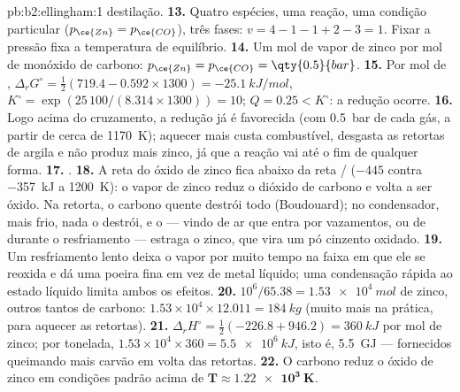\begin{solution}{pb:b2:ellingham:1}
destilação.
\textbf{13.} Quatro espécies, uma reação, uma condição particular ($p_{\ce{Zn}} =
p_{\ce{CO}}$), três fases: $v = 4 - 1 - 1 + 2 - 3 = 1$. Fixar a pressão
fixa a temperatura de equilíbrio.
\textbf{14.} Um mol de vapor de zinco por mol de monóxido de carbono:
$p_{\ce{Zn}} = p_{\ce{CO}} = \qty{0.5}{bar}$.
\textbf{15.} Por mol de , $\Delta_r G^\circ = \frac12(719.4 - 0.592 \times
1300) = \qty{-25.1}{kJ/mol}$, $K^\circ = \exp(25\,100/(8.314 \times 1300)) = 10$;
$Q = 0.25 < K^\circ$: a redução ocorre.
\textbf{16.} Logo acima do cruzamento, a redução já é favorecida (com
\qty{0.5}{bar} de cada gás, a partir de cerca de \qty{1170}{K}); aquecer mais
custa combustível, desgasta as retortas de argila e não produz mais zinco,
já que a reação vai até o fim de qualquer forma.
\textbf{17.} .
\textbf{18.} A reta do óxido de zinco fica abaixo da reta /
($-445$ contra \qty{-357}{kJ} a \qty{1200}{K}): o vapor de zinco reduz o dióxido
de carbono e volta a ser óxido. Na retorta, o carbono quente destrói todo
 (Boudouard); no condensador, mais frio, nada o destrói, e o  ---
vindo de ar que entra por vazamentos, ou de  durante o
resfriamento --- estraga o zinco, que vira um pó cinzento oxidado.
\textbf{19.} Um resfriamento lento deixa o vapor por muito tempo na faixa em
que ele se reoxida e dá uma poeira fina em vez de metal líquido; uma
condensação rápida ao estado líquido limita ambos os efeitos.
\textbf{20.} $10^6/65.38 = \qty{1.53e4}{mol}$ de zinco, outros tantos de carbono:
$1.53 \times 10^4 \times 12.011 = \qty{184}{kg}$ (muito mais na prática, para
aquecer as retortas).
\textbf{21.} $\Delta_r H^\circ = \frac12(-226.8 + 946.2) = \qty{+360}{kJ}$ por
mol de zinco; por tonelada, $1.53 \times 10^4 \times 360 = \qty{5.5e6}{kJ}$, isto é,
\qty{5.5}{GJ} --- fornecidos queimando mais carvão em volta das retortas.
\textbf{22.} O carbono reduz o óxido de zinco em condições padrão acima de
$\boldsymbol{T \approx \qty{1.22e3}{K}}$.
\end{solution}
